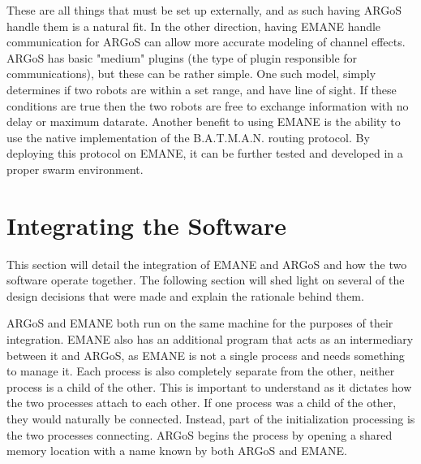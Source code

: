These are all things that must be set up externally, and as such having ARGoS handle them is a natural fit.
In the other direction, having EMANE handle communication for ARGoS can allow more accurate modeling of channel effects.
ARGoS has basic "medium" plugins (the type of plugin responsible for communications), but these can be rather simple.
One such model, simply determines if two robots are within a set range, and have line of sight.
If these conditions are true then the two robots are free to exchange information with no delay or maximum datarate.
Another benefit to using EMANE is the ability to use the native implementation of the B.A.T.M.A.N. routing protocol.
By deploying this protocol on EMANE, it can be further tested and developed in a proper swarm environment.

\section{Integrating the Software}
This section will detail the integration of EMANE and ARGoS and how the two software operate together.
The following section will shed light on several of the design decisions that were made and explain the rationale behind them.\par
ARGoS and EMANE both run on the same machine for the purposes of their integration.
EMANE also has an additional program that acts as an intermediary between it and ARGoS, as EMANE is not a single process and needs something to manage it.
Each process is also completely separate from the other, neither process is a child of the other.
This is important to understand as it dictates how the two processes attach to each other.
If one process was a child of the other, they would naturally be connected. Instead, part of the initialization processing is the two processes connecting.
ARGoS begins the process by opening a shared memory location with a name known by both ARGoS and EMANE.
